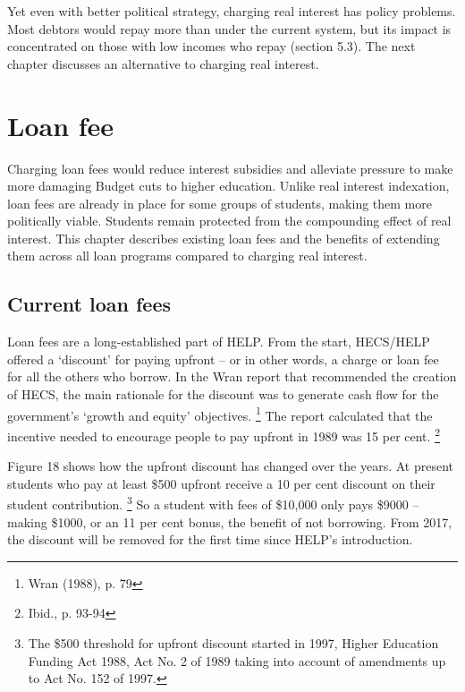\documentclass[embargoed]{grattan}
\begin{document}
Yet even with better political strategy, charging real interest has policy problems.
Most debtors would repay more than under the current system, but its impact is concentrated on those with low incomes who repay (section 5.3).
The next chapter discusses an alternative to charging real interest.

\chapter{Loan fee}\label{chap:loan-fee}

Charging loan fees would reduce interest subsidies and alleviate pressure to make more damaging Budget cuts to higher education.
Unlike real interest indexation, loan fees are already in place for some groups of students, making them more politically viable.
Students remain protected from the compounding effect of real interest.
This chapter describes existing loan fees and the benefits of extending them across all loan programs compared to charging real interest.

\section{Current loan fees}\label{sec:current-loan-fees}

Loan fees are a long-established part of HELP.
From the start, HECS/HELP offered a `discount' for paying upfront -- or in other words, a charge or loan fee for all the others who borrow.
In the Wran report that recommended the creation of HECS, the main rationale for the discount was to generate cash flow for the government's `growth and equity' objectives.%
\footnote{Wran (1988), p. 79} The report calculated that the incentive needed to encourage people to pay upfront in 1989 was 15 per cent.%
\footnote{Ibid., p. 93-94}

Figure 18 shows how the upfront discount has changed over the years.
At present students who pay at least \$500 upfront receive a 10 per cent discount on their student contribution.%
\footnote{The \$500 threshold for upfront discount started in 1997, Higher Education Funding Act 1988, Act No. 2 of 1989 taking into account of amendments up to Act No. 152 of 1997.} So a student with fees of \$10,000 only pays \$9000 -- making \$1000, or an 11 per cent bonus, the benefit of not borrowing.
From 2017, the discount will be removed for the first time since HELP's introduction.
\end{document}
